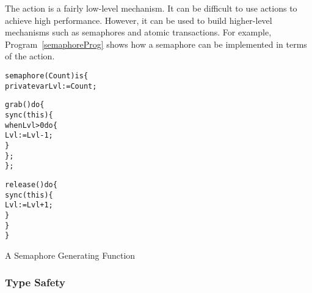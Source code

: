 \begin{aside}
The  action is a fairly low-level mechanism. It can be difficult to use  actions to achieve high performance. However, it can be used to build higher-level mechanisms such as semaphores and atomic transactions. For example, Program~\vref{semaphoreProg} shows how a semaphore can be implemented in terms of the  action.
%
\end{aside}
\begin{program}
\begin{alltt}
semaphore(Count) is \{
  private var Lvl := Count;
    
  grab() do \{
    sync(this)\{
      when Lvl>0 do \{
        Lvl := Lvl-1;
      \}
    \};
  \};
    
  release() do \{
    sync(this)\{
      Lvl := Lvl+1;
    \}
  \}
\}
\end{alltt}
\caption{A Semaphore Generating Function\label{semaphoreProg}}
\end{program}

\subsubsection{Type Safety}
\begin{prooftree}
\end{prooftree}




